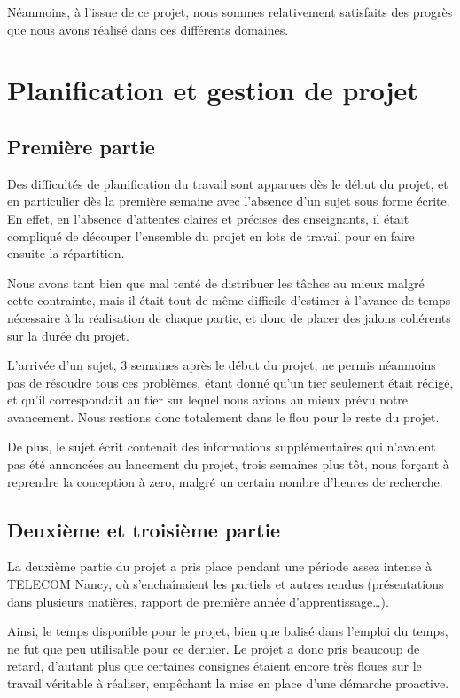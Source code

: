 \documentclass[a4paper, 11pt, twoside]{book}
\renewcommand{\tn}{TELECOM Nancy}
\begin{document}
Néanmoins, à l'issue de ce projet, nous sommes relativement satisfaits des progrès que nous avons réalisé dans ces différents domaines.

\section{Planification et gestion de projet}

\subsection{Première partie}

Des difficultés de planification du travail sont apparues dès le début du projet, et en particulier dès la première semaine avec l'absence d'un sujet sous forme écrite. En effet, en l'absence d'attentes claires et précises des enseignants, il était compliqué de découper l'ensemble du projet en lots de travail pour en  faire ensuite la répartition.

Nous avons tant bien que mal tenté de distribuer les tâches au mieux malgré cette contrainte, mais il était tout de même difficile d'estimer à l'avance de temps nécessaire à la réalisation de chaque partie, et donc de placer des jalons cohérents sur la durée du projet.

L'arrivée d'un sujet, 3 semaines après le début du projet, ne permis néanmoins pas de résoudre tous ces problèmes, étant donné qu'un tier seulement était rédigé, et qu'il correspondait au tier sur lequel nous avions au mieux prévu notre avancement. Nous restions donc totalement dans le flou pour le reste du projet.

De plus, le sujet écrit contenait des informations supplémentaires qui n'avaient pas été annoncées au lancement du projet, trois semaines plus tôt, nous forçant à reprendre la conception à zero, malgré un certain nombre d'heures de recherche.

\subsection{Deuxième et troisième partie}

La deuxième partie du projet a pris place pendant une période assez intense à \tn{}, où s'enchaînaient les partiels et autres rendus (présentations dans plusieurs matières, rapport de première année d'apprentissage\ldots{}).

Ainsi, le temps disponible pour le projet, bien que balisé dans l'emploi du temps, ne fut que peu utilisable pour ce dernier. Le projet a donc pris beaucoup de retard, d'autant plus que certaines consignes étaient encore très floues sur le travail véritable à réaliser, empêchant la mise en place d'une démarche proactive.
\end{document}
